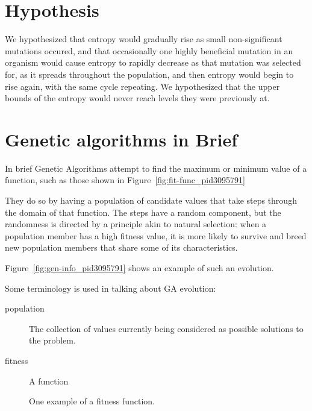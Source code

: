 \documentclass[11pt]{article}
\begin{document}
\section{Hypothesis}
\label{sec:org26a3be1}
We hypothesized that entropy would gradually rise as small non-significant
mutations occured, and that occasionally one highly beneficial mutation in
an organism would cause entropy to rapidly decrease as that mutation was
selected for, as it spreads throughout the population, and then entropy would
begin to rise again, with the same cycle repeating. We hypothesized that the
upper bounds of the entropy would never reach levels they were previously at.


\section{Genetic algorithms in Brief}

In brief Genetic Algorithms attempt to find the maximum or minimum
value of a function, such as those shown in
Figure~\ref{fig:fit-func_pid3095791}

They do so by having a population of candidate values that take steps
through the domain of that function.  The steps have a random
component, but the randomness is directed by a principle akin to
natural selection: when a population member has a high fitness value,
it is more likely to survive and breed new population members that
share some of its characteristics.

Figure~\ref{fig:gen-info_pid3095791} shows an example of such an
evolution.

Some terminology is used in talking about GA evolution:

\begin{description}
\item[population] The collection of values currently being considered
  as possible solutions to the problem.
\item[fitness] A function 
\end{description}


\begin{figure}
  \label{fig:fit-func_pid3095791}
  \centering
  \caption{One example of a fitness function.}
  \label{fig:multi-step}
\end{figure}
\end{document}
